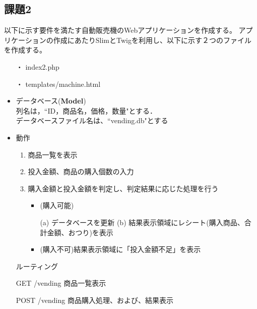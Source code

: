 \documentclass[12pt]{jarticle}
\begin{document}
\clearpage

\subsection{課題2}
\begin{shadebox}
    以下に示す要件を満たす自動販売機のWebアプリケーションを作成する。
    アプリケーションの作成にあたりSlimとTwigを利用し、以下に示す２つのファイルを作成する。

    \begin{itemize}
        \item[・] index2.php
        \item[・] templates/machine.html
    \end{itemize}
    \begin{itemize}
        \item データベース({\bf Model})\\
              列名は，``ID，商品名，価格，数量"とする．\\
              データベースファイル名は、``vending.db"とする
              \newpage
        \item 動作
              \begin{enumerate}
                  \item 商品一覧を表示
                  \item 投入金額、商品の購入個数の入力
                  \item 購入金額と投入金額を判定し、判定結果に応じた処理を行う
                        \begin{itemize}
                            \item (購入可能)

                                  (a) データベースを更新
                                  (b) 結果表示領域にレシート(購入商品、合計金額、おつり)を表示

                            \item(購入不可)結果表示領域に「投入金額不足」を表示
                        \end{itemize}
              \end{enumerate}
              ルーティング

              GET /vending 商品一覧表示

              POST /vending 商品購入処理、および、結果表示
    \end{itemize}
\end{shadebox}
\end{document}
